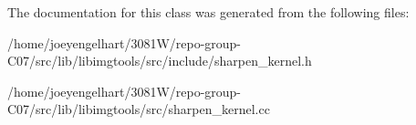 The documentation for this class was generated from the following files\+:\begin{DoxyCompactItemize}
\item 
/home/joeyengelhart/3081\+W/repo-\/group-\/\+C07/src/lib/libimgtools/src/include/sharpen\+\_\+kernel.\+h\item 
/home/joeyengelhart/3081\+W/repo-\/group-\/\+C07/src/lib/libimgtools/src/sharpen\+\_\+kernel.\+cc\end{DoxyCompactItemize}

